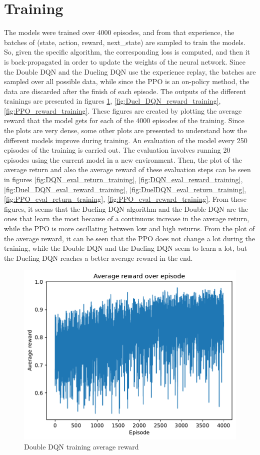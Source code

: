 \documentclass{article}
\begin{document}
\section{Training}\label{section:Training}
The models were trained over 4000 episodes, and from that experience, the batches of (state, action, reward, next\_state) are sampled to train the models. So, given the specific algorithm, the corresponding loss is computed, and then it is back-propagated in order to update the weights of the neural network.
Since the Double DQN and the Dueling DQN use the experience replay, the batches are sampled over all possible data, while since the PPO is an on-policy method, the data are discarded after the finish of each episode.
The outputs of the different trainings are presented in figures \ref{fig:DQN_reward_training}, \ref{fig:Duel_DQN_reward_training}, \ref{fig:PPO_reward_training}. These figures are created by plotting the average reward that the model gets for each of the 4000 episodes of the training.
Since the plots are very dense, some other plots are presented to understand how the different models improve during training. An evaluation of the model every 250 episodes of the training is carried out. The evaluation involves running 20 episodes using the current model in a new environment. Then, the plot of the average return and also the average reward of these evaluation steps can be seen in figures \ref{fig:DQN_eval_return_training}, \ref{fig:DQN_eval_reward_training}, \ref{fig:Duel_DQN_eval_reward_training}, \ref{fig:DuelDQN_eval_return_training}, \ref{fig:PPO_eval_return_training}, \ref{fig:PPO_eval_reward_training}.
From these figures, it seems that the Dueling DQN algorithm and the Double DQN are the ones that learn the most because of a continuous increase in the average return, while the PPO is more oscillating between low and high returns. From the plot of the average reward, it can be seen that the PPO does not change a lot during the training, while the Double DQN and the Dueling DQN seem to learn a lot, but the Dueling DQN reaches a better average reward in the end.

\begin{figure}
    \centering
    \includegraphics[width=0.7\linewidth]{img/DQN_training.pdf}
    \caption{Double DQN training average reward}
    \label{fig:DQN_reward_training}
\end{figure}
\end{document}
